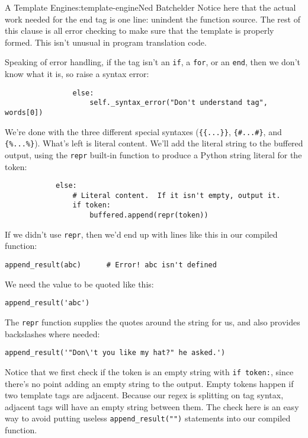 \begin{aosachapter}{A Template Engine}{s:template-engine}{Ned Batchelder}
Notice here that the actual work needed for the end tag is one line:
unindent the function source. The rest of this clause is all error
checking to make sure that the template is properly formed. This isn't
unusual in program translation code.

Speaking of error handling, if the tag isn't an \texttt{if}, a
\texttt{for}, or an \texttt{end}, then we don't know what it is, so
raise a syntax error:

\begin{verbatim}
                else:
                    self._syntax_error("Don't understand tag", words[0])
\end{verbatim}

We're done with the three different special syntaxes
(\texttt{\{\{...\}\}}, \texttt{\{\#...\#\}}, and \texttt{\{\%...\%\}}).
What's left is literal content. We'll add the literal string to the
buffered output, using the \texttt{repr} built-in function to produce a
Python string literal for the token:

\begin{verbatim}
            else:
                # Literal content.  If it isn't empty, output it.
                if token:
                    buffered.append(repr(token))
\end{verbatim}

If we didn't use \texttt{repr}, then we'd end up with lines like this in
our compiled function:

\begin{verbatim}
append_result(abc)      # Error! abc isn't defined
\end{verbatim}

We need the value to be quoted like this:

\begin{verbatim}
append_result('abc')
\end{verbatim}

The \texttt{repr} function supplies the quotes around the string for us,
and also provides backslashes where needed:

\begin{verbatim}
append_result('"Don\'t you like my hat?" he asked.')
\end{verbatim}

Notice that we first check if the token is an empty string with
\texttt{if token:}, since there's no point adding an empty string to the
output. Empty tokens happen if two template tags are adjacent. Because
our regex is splitting on tag syntax, adjacent tags will have an empty
string between them. The check here is an easy way to avoid putting
useless \texttt{append\_result("")} statements into our compiled
function.


\end{aosachapter}
